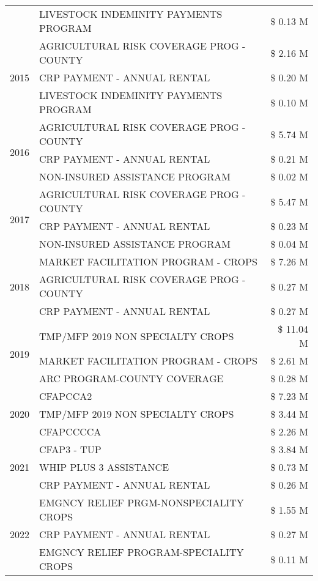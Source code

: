 \begin{tabular}{llr}
 & LIVESTOCK INDEMINITY PAYMENTS PROGRAM & \$ 0.13 M \\
\cline{1-3}
\multirow[t]{3}{*}{2015} & AGRICULTURAL RISK COVERAGE PROG - COUNTY & \$ 2.16 M \\
 & CRP PAYMENT - ANNUAL RENTAL & \$ 0.20 M \\
 & LIVESTOCK INDEMINITY PAYMENTS PROGRAM & \$ 0.10 M \\
\cline{1-3}
\multirow[t]{3}{*}{2016} & AGRICULTURAL RISK COVERAGE PROG - COUNTY & \$ 5.74 M \\
 & CRP PAYMENT - ANNUAL RENTAL & \$ 0.21 M \\
 & NON-INSURED ASSISTANCE PROGRAM & \$ 0.02 M \\
\cline{1-3}
\multirow[t]{3}{*}{2017} & AGRICULTURAL RISK COVERAGE PROG - COUNTY & \$ 5.47 M \\
 & CRP PAYMENT - ANNUAL RENTAL & \$ 0.23 M \\
 & NON-INSURED ASSISTANCE PROGRAM & \$ 0.04 M \\
\cline{1-3}
\multirow[t]{3}{*}{2018} & MARKET FACILITATION PROGRAM - CROPS & \$ 7.26 M \\
 & AGRICULTURAL RISK COVERAGE PROG - COUNTY & \$ 0.27 M \\
 & CRP PAYMENT - ANNUAL RENTAL & \$ 0.27 M \\
\cline{1-3}
\multirow[t]{3}{*}{2019} & TMP/MFP 2019 NON SPECIALTY CROPS & \$ 11.04 M \\
 & MARKET FACILITATION PROGRAM - CROPS & \$ 2.61 M \\
 & ARC PROGRAM-COUNTY COVERAGE & \$ 0.28 M \\
\cline{1-3}
\multirow[t]{3}{*}{2020} & CFAPCCA2 & \$ 7.23 M \\
 & TMP/MFP 2019 NON SPECIALTY CROPS & \$ 3.44 M \\
 & CFAPCCCCA & \$ 2.26 M \\
\cline{1-3}
\multirow[t]{3}{*}{2021} & CFAP3 - TUP & \$ 3.84 M \\
 & WHIP PLUS 3 ASSISTANCE & \$ 0.73 M \\
 & CRP PAYMENT - ANNUAL RENTAL & \$ 0.26 M \\
\cline{1-3}
\multirow[t]{3}{*}{2022} & EMGNCY RELIEF PRGM-NONSPECIALITY CROPS & \$ 1.55 M \\
 & CRP PAYMENT - ANNUAL RENTAL & \$ 0.27 M \\
 & EMGNCY RELIEF PROGRAM-SPECIALITY CROPS & \$ 0.11 M \\
\cline{1-3}
\bottomrule
\end{tabular}
